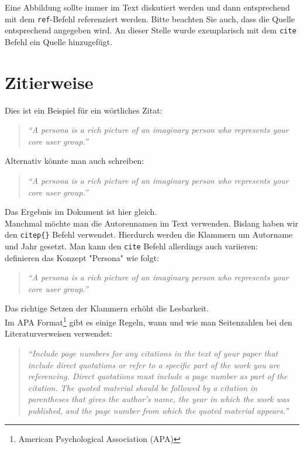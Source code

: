 Eine Abbildung sollte immer im Text diskutiert werden und dann entsprechend mit dem \texttt{ref{}}-Befehl referenziert werden. Bitte beachten Sie auch, dass die Quelle entsprechend angegeben wird. An dieser Stelle wurde exemplarisch mit dem \texttt{cite{}} Befehl ein Quelle hinzugefügt.

\section{Zitierweise}
Dies ist ein Beispiel für ein wörtliches Zitat:
\begin{quotation}
	\emph{``A persona is a rich picture of an imaginary person who represents your core user group.''} \citep{Dix04}
\end{quotation}

Alternativ könnte man auch schreiben: 
\begin{quotation}
	\textit{\enquote{A persona is a rich picture of an imaginary person who represents your core user group.}} \citep{Dix04}
\end{quotation}

Das Ergebnis im Dokument ist hier gleich. \\

Manchmal möchte man die Autorennamen im Text verwenden. Bislang haben wir den \texttt{citep\{\}} Befehl verwendet. Hierdurch werden die Klammern um Autorname und Jahr gesetzt. Man kann den \texttt{cite} Befehl allerdings auch variieren: \\

\cite{Dix04} definieren das Konzept "Persona" wie folgt: 
\begin{quotation}
	\emph{``A persona is a rich picture of an imaginary person who represents your core user group.''}
	\citep{Dix04}
\end{quotation}

Das richtige Setzen der Klammern erhöht die Lesbarkeit. \\

Im APA Format\footnote{ American Psychological Association (APA)} gibt es einige Regeln, wann und wie man Seitenzahlen bei den Literaturverweisen verwendet:

\begin{quotation}
	\emph{``Include page numbers for any citations in the text of your paper that include direct quotations or refer to a specific part of the work you are referencing. Direct quotations must include a page number as part of the citation. The quoted material should be followed by a citation in parentheses that gives the author's name, the year in which the work was published, and the page number from which the quoted material appears.''}
	\citep{Hall}
\end{quotation}

